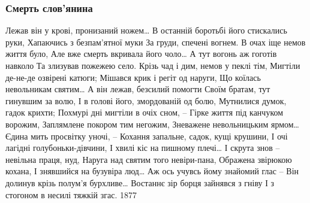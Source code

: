  
 
 

\subsubsection{Смерть слов’янина}

Лежав він у крові, пронизаний ножем…
В останній боротьбі його стискались руки,
Хапаючись з безпам’ятної муки
За груди, спечені вогнем.
В очах іще немов життя було,
Але вже смерть вкривала його чоло…
А тут вогонь аж гоготів навколо
Та злизував пожежею село.
Крізь чад і дим, немов у пеклі тім,
Мигтіли де-не-де озвірені катюги;
Мішався крик і регіт од наруги,
Що коїлась невольникам святим…
А він лежав, безсилий помогти
Своїм братам, тут гинувшим за волю,
І в голові його, змордованій од болю,
Мутнилися думок, гадок крихти;
Похмурі дні мигтіли в очіх сном, –
Гірке життя під канчуком ворожим,
Заплямлене покором тим негожим,
Зневажене невольницьким ярмом…
Єдина мить просвітку уночі, –
Кохання запальне, садок, кущі крушини,
І очі лагідні голубоньки-дівчини,
І хвилі кіс на пишному плечі…
І скрута знов – невільна праця, нуд,
Наруга над святим того невіри-пана,
Ображена звірюкою кохана,
І знявшийся на бузувіра люд…
Аж ось учувсь йому знайомий глас –
Він долинув крізь полум’я бурхливе…
Востаннє зір борця зайнявся з гніву
І з стогоном в несилі тяжкій згас.
1877 
